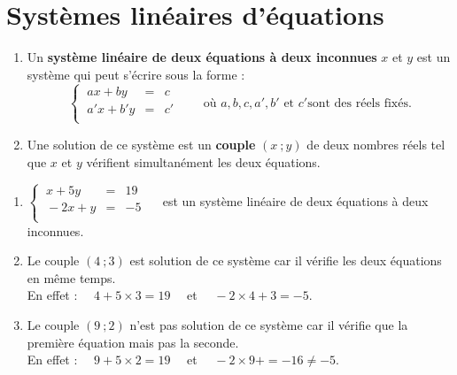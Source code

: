 \documentclass[a4paper,11pt,cours]{nsi}
\begin{document}



\section{Systèmes linéaires d'équations}
\begin{definition}[s]
	\begin{enumerate}[label=\textbullet]
		\item 	Un \textbf{système linéaire de deux équations à deux inconnues} $x$ et $y$ est un système qui peut s'écrire sous la forme :
		$$\left\{
		\begin{array}{cll}
			\ ax+by&=&c \\
			\ a'x+b'y&=&c' \\
		\end{array} \right. \qquad \text{où }a,b,c,a',b'\text{ et }c'\text{sont des réels fixés.} $$
		\item 	Une solution de ce système est un \textbf{couple} $(x\ ;y)$ de deux nombres réels tel que $x$ et $y$ vérifient simultanément les deux équations.	
	\end{enumerate}
\end{definition}

\begin{exemple}[s]
	\begin{enumerate}[label=\textbullet]
		\item 	$\left\{
		\begin{array}{cll}
			\ x+5y&=&19 \\
			\ -2x+y&=&-5 \\
		\end{array} \right.\quad$ est un système linéaire de deux équations à deux inconnues.
		\item 	Le couple $(4\ ;3)$ est solution de ce système car il vérifie les deux équations en même temps.\\
		En effet : $\quad 4+5\times3=19 \quad$ et $\quad-2\times4+3=-5$.
		\item	Le couple $(9\ ;2)$ n'est pas solution de ce système car il vérifie que la première équation mais pas la seconde.\\
		En effet : $\quad 9+5\times2=19 \quad$ et $\quad-2\times9+=-16\neq-5$.
	\end{enumerate}
\end{exemple}
\end{document}
